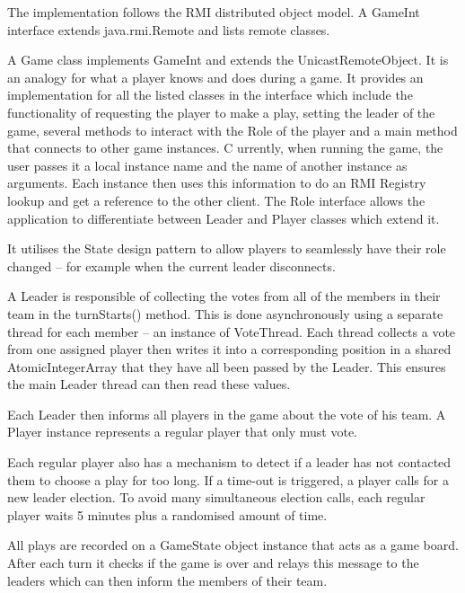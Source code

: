 \documentclass[conference]{IEEEtran}
\begin{document}
The implementation follows the RMI distributed object model. A GameInt interface extends java.rmi.Remote and lists remote classes.

A Game class implements GameInt and extends the UnicastRemoteObject. It is an analogy for what a player knows and does during a game. It provides an implementation for all the listed classes in the interface which include the functionality of requesting the player to make a play, setting the leader of the game, several methods to interact with the Role of the player and a main method that connects to other game instances. 
C
urrently, when running the game, the user passes it a local instance name and the name of another instance as arguments. Each instance then uses this information to do an RMI Registry lookup and get a reference to the other client. The Role interface allows the application to differentiate between Leader and Player classes which extend it. 

It utilises the State design pattern to allow players to seamlessly have their role changed – for example when the current leader disconnects. 

A Leader is responsible of collecting the votes from all of the members in their team in the turnStarts() method. This is done asynchronously using a separate thread for each member – an instance of VoteThread. Each thread collects a vote from one assigned player then writes it into a corresponding position in a shared AtomicIntegerArray that they have all been passed by the Leader. This ensures the main Leader thread can then read these values. 

Each Leader then informs all players in the game about the vote of his team. A Player instance represents a regular player that only must vote. 

Each regular player also has a mechanism to detect if a leader has not contacted them to choose a play for too long. If a time-out is triggered, a player calls for a new leader election. To avoid many simultaneous election calls, each regular player waits 5 minutes plus a randomised amount of time.

All plays are recorded on a GameState object instance that acts as a game board. After each turn it checks if the game is over and relays this message to the leaders which can then inform the members of their team.
 
 
\end{document}

